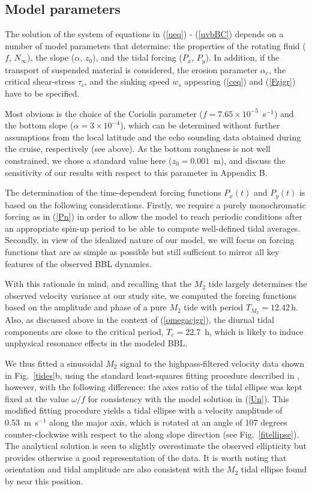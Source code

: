 \subsection{Model parameters}\label{parameters}

The solution of the system of equations in (\ref{ueq}) - (\ref{uvbBC})
depends on a number of model parameters that determine: the properties
of the rotating fluid ($f$, $N_\infty$), the slope ($\alpha$, $z_0$),
and the tidal forcing ($P_x$, $P_y$). In addition, if the transport of
suspended material is considered, the erosion parameter $\alpha_e$,
the critical shear-stress $\tau_c$, and the sinking speed $w_s$
appearing (\ref{ceq}) and (\ref{Fzjgr}) have to be specified.

Most obvious is the choice of the Coriolis parameter ($f=7.65 \times
10^{-5}$~s$^{-1}$) and the bottom slope ($\alpha=3 \times 10^{-4}$),
which can be determined without further assumptions from the local
latitude and the echo sounding data obtained during the cruise,
respectively (see above). As the bottom roughness is not well
constrained, we chose a standard value here ($z_0=0.001$~m), and
discuss the sensitivity of our results with respect to this parameter
in Appendix B.

The determination of the time-dependent forcing functions $P_x(t)$ and
$P_y(t)$ is based on the following considerations. Firstly, we require
a purely monochromatic forcing as in (\ref{Pn}) in order to allow the
model to reach periodic conditions after an appropriate spin-up period
to be able to compute well-defined tidal averages. Secondly, in view
of the idealized nature of our model, we will focus on forcing
functions that are as simple as possible but still sufficient to
mirror all key features of the observed BBL dynamics.

With this rationale in mind, and recalling that the $M_2$ tide largely
determines the observed velocity variance at our study site, we
computed the forcing functions based on the amplitude and phase of a
pure $M_2$ tide with period $T_{M_2} = 12.42\,\text{h}$. Also, as
discussed above in the context of (\ref{omegacjgr}), the diurnal tidal
components are close to the critical period, $T_c=22.7$~h, which is
likely to induce unphysical resonance effects in the modeled BBL.

We thus fitted a sinusoidal $M_2$ signal to the highpass-filtered
velocity data shown in Fig.\ \ref{tides}b, using the standard
least-squares fitting procedure described in \cite{EmeryThomson2001a},
however, with the following difference: the axes ratio of the tidal
ellipse was kept fixed at the value $\omega/f$ for consistency with
the model solution in (\ref{Un}). This modified fitting procedure
yields a tidal ellipse with a velocity amplitude of 0.53~m~s$^{-1}$
along the major axis, which is rotated at an angle of 107 degrees
counter-clockwise with respect to the along slope direction (see
Fig.\ \ref{fitellipse}). The analytical solution is seen to slightly
overestimate the observed ellipticity but provides otherwise a good
representation of the data.  It is worth noting that orientation and
tidal amplitude are also consistent with the $M_2$ tidal ellipse found
by \cite{Baoetal2000} near this position.

